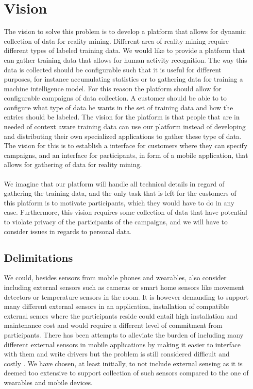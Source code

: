 \section{Vision}
\label{sec:vision}
The vision to solve this problem is to develop a platform that allows for dynamic collection of data for reality mining. Different area of reality mining require different types of labeled training data. We would like to provide a platform that can gather training data that allows for human activity recognition. The way this data is collected should be configurable such that it is useful for different purposes, for instance accumulating statistics or to gathering data for training a machine intelligence model. For this reason the platform should allow for configurable campaigns of data collection. A customer should be able to to configure what type of data he wants in the set of training data and how the entries should be labeled. The vision for the platform is that people that are in needed of context aware training data can use our platform instead of developing and distributing their own specialized applications to gather these type of data. The vision for this is to establish a interface for customers where they can specify campaigns, and an interface for participants, in form of a mobile application, that allows for gathering of data for reality mining.
\\\\
We imagine that our platform will handle all technical details in regard of gathering the training data, and the only task that is left for the customers of this platform is to motivate participants, which they would have to do in any case. Furthermore, this vision requires some collection of data that have potential to violate privacy of the participants of the campaigns, and we will have to consider issues in regards to personal data.

\subsection{Delimitations}
\label{sub:delimitations}
We could, besides sensors from mobile phones and wearables, also consider including external sensors such as cameras or smart home sensors like movement detectors or temperature sensors in the room. It is however demanding to support many different external sensors in an application, installation of compatible external senors where the participants reside could entail high installation and maintenance cost and would require a different level of commitment from participants. There has been attempts to alleviate the burden of including many different external sensors in mobile applications by making it easier to interface with them and write drivers but the problem is still considered difficult and costly \parencite{open_data_kit}. We have chosen, at least initially, to not include external sensing as it is deemed too extensive to support collection of such sensors compared to the one of wearables and mobile devices.